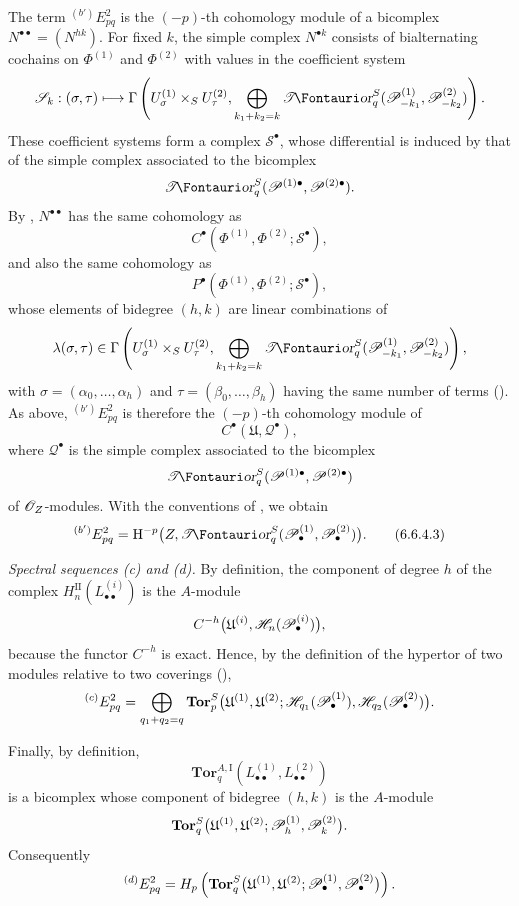 \begin{env}[6.6.4]
The term ${}^{(b')}E_{pq}^2$ is the $(-p)$-th cohomology module
of a bicomplex $N^{\bullet\bullet}=(N^{hk})$.  For fixed $k$,
the simple complex $N^{\bullet k}$ consists of bialternating
cochains on $\Phi^{(1)}$ and $\Phi^{(2)}$ with values in the
coefficient system
\[
  \mathcal S_k:(\sigma,\tau)\longmapsto
  \Gamma\left(
    U_\sigma^{(1)}\times_SU_\tau^{(2)},
    \bigoplus_{k_1+k_2=k}
    \shTor_q^S(\sh P_{-k_1}^{(1)},\sh P_{-k_2}^{(2)})
  \right).
\]
These coefficient systems form a complex
$\mathcal S^\bullet$, whose differential is induced by that of
the simple complex associated to the bicomplex
\[
  \shTor_q^S
  (\sh P^{(1)\bullet},\sh P^{(2)\bullet}).
\]
By , $N^{\bullet\bullet}$ has the same
cohomology as
\[
  C^\bullet
  (\Phi^{(1)},\Phi^{(2)};\mathcal S^\bullet),
\]
and also the same cohomology as
\[
  P^\bullet
  (\Phi^{(1)},\Phi^{(2)};\mathcal S^\bullet),
\]
whose elements of bidegree $(h,k)$ are linear combinations of
\[
  \lambda(\sigma,\tau)\in
  \Gamma\left(
    U_\sigma^{(1)}\times_SU_\tau^{(2)},
    \bigoplus_{k_1+k_2=k}
    \shTor_q^S(\sh P_{-k_1}^{(1)},\sh P_{-k_2}^{(2)})
  \right),
\]
with $\sigma=(\alpha_0,\ldots,\alpha_h)$ and
$\tau=(\beta_0,\ldots,\beta_h)$ having the same number of terms
().  As above, ${}^{(b')}E_{pq}^2$ is
therefore the $(-p)$-th cohomology module of
\[
  C^\bullet(\mathfrak U,\mathcal Q^\bullet),
\]
where $\mathcal Q^\bullet$ is the simple complex associated to
the bicomplex
\[
  \shTor_q^S
  (\sh P^{(1)\bullet},\sh P^{(2)\bullet})
\]
of $\mathscr{O}_Z$-modules.  With the conventions of
, we obtain
\[
  {}^{(b')}E_{pq}^2
  =
  \HH^{-p}
  \bigl(
    Z,\shTor_q^S
    (\sh P_\bullet^{(1)},\sh P_\bullet^{(2)})
  \bigr).
  \tag{6.6.4.3}\label{III.6.6.4.3}
\]
\end{env}


\begin{env}[6.6.5]
\label{III.6.6.5}
\emph{Spectral sequences \textnormal{(c)} and
\textnormal{(d)}.}
By definition, the component of degree $h$ of the complex
$H_n^{\mathrm{II}}(L_{\bullet\bullet}^{(i)})$ is the
$A$-module
\[
  C^{-h}
  \bigl(
    \mathfrak U^{(i)},
    \mathscr{H}_n(\mathscr{P}_\bullet^{(i)})
  \bigr),
\]
because the functor $C^{-h}$ is exact.  Hence, by the definition
of the hypertor of two modules relative to two coverings
(),
\[
  {}^{(c)}E_{pq}^2
  =
  \bigoplus_{q_1+q_2=q}
  \mathbf{Tor}_p^S
  \bigl(
    \mathfrak U^{(1)},\mathfrak U^{(2)};
    \mathscr{H}_{q_1}(\mathscr{P}_\bullet^{(1)}),
    \mathscr{H}_{q_2}(\mathscr{P}_\bullet^{(2)})
  \bigr).
\]

Finally, by definition,
\[
  \mathbf{Tor}_q^{A,\mathrm I}
  (L_{\bullet\bullet}^{(1)},L_{\bullet\bullet}^{(2)})
\]
is a bicomplex whose component of bidegree $(h,k)$ is the
$A$-module
\[
  \mathbf{Tor}_q^S
  \bigl(
    \mathfrak U^{(1)},\mathfrak U^{(2)};
    \mathscr{P}_h^{(1)},\mathscr{P}_k^{(2)}
  \bigr).
\]
Consequently
\[
  {}^{(d)}E_{pq}^2
  =
  H_p\left(
    \mathbf{Tor}_q^S
    \bigl(
      \mathfrak U^{(1)},\mathfrak U^{(2)};
      \mathscr{P}_\bullet^{(1)},\mathscr{P}_\bullet^{(2)}
    \bigr)
  \right).
\]
\end{env}

